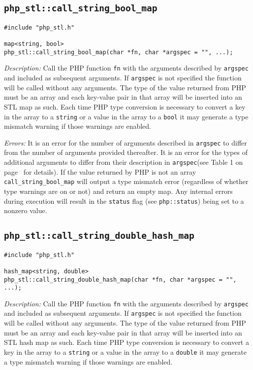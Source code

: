 \documentclass[11pt,titlepage]{article}
\begin{document}
\subsection{\texttt{php\_stl::call\_string\_bool\_map}}

\begin{verbatim}
#include "php_stl.h"

map<string, bool> 
php_stl::call_string_bool_map(char *fn, char *argspec = "", ...);
\end{verbatim}

\emph{Description:} Call the PHP function \verb|fn| with the arguments described by \verb|argspec| and included as subsequent arguments. If \verb|argspec| is not specified the function will be called without any arguments. The type of the value returned from PHP must be an array and each key-value pair in that array will be inserted into an STL map as such. Each time PHP type conversion is necessary to convert a key in the array to a \verb|string| or a value in the array to a \verb|bool| it may generate a type mismatch warning if those warnings are enabled.

\emph{Errors:} It is an error for the number of arguments described in \verb|argspec| to differ from the number of arguments provided thereafter. It is an error for the types of additional arguments to differ from their description in \verb|argspec|(see Table 1 on page~\pageref{Table1} for details). If the value returned by PHP is not an array \verb|call_string_bool_map| will output a type mismatch error (regardless of whether type warnings are on or not) and return an empty map. Any internal errors during execution will result in the \verb|status| flag (see \verb|php::status|) being set to a nonzero value.


\subsection{\texttt{php\_stl::call\_string\_double\_hash\_map}}

\begin{verbatim}
#include "php_stl.h"

hash_map<string, double> 
php_stl::call_string_double_hash_map(char *fn, char *argspec = "", ...);
\end{verbatim}

\emph{Description:} Call the PHP function \verb|fn| with the arguments described by \verb|argspec| and included as subsequent arguments. If \verb|argspec| is not specified the function will be called without any arguments. The type of the value returned from PHP must be an array and each key-value pair in that array will be inserted into an STL hash map as such. Each time PHP type conversion is necessary to convert a key in the array to a \verb|string| or a value in the array to a \verb|double| it may generate a type mismatch warning if those warnings are enabled.
\end{document}
